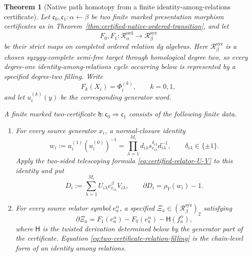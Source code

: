 \documentclass[11pt]{article}
\newtheorem{theorem}{Theorem}[section]
\theoremstyle{definition}
\begin{document}
\begin{theorem}[Native path homotopy from a finite identity-among-relations certificate]\label{thm:native-ordered-path-homotopy}
Let $\mathfrak c_0,\mathfrak c_1:\alpha\leftarrow\beta$ be two finite marked
presentation morphism certificates as in
Theorem~\ref{thm:certified-native-ordered-transition}, and let
\[
 F_0,F_1:\mathcal R_\alpha^{\mathrm{ord}}\longrightarrow
 \mathcal R_\beta^{\mathrm{syz}}
\]
be their strict maps on completed ordered relation dg algebras.  Here
$\mathcal R_\beta^{\mathrm{syz}}$ is a chosen syzygy-complete semi-free target
through homological degree two, so every degree-one identity-among-relations
cycle occurring below is represented by a specified degree-two filling.  Write
\[
 F_k(X_i)=\Phi_i^{(k)},\qquad k=0,1,
\]
and let $u_i^{(k)}(y)$ be the corresponding generator word.

A \emph{finite marked two-certificate}
$\mathfrak h:\mathfrak c_0\Rightarrow\mathfrak c_1$ consists of the following
finite data.
\begin{enumerate}[label=\textnormal{(\alph*)}]
\item For every source generator $x_i$, a normal-closure identity
\begin{equation}\label{eq:two-certificate-generator-identity}
 w_i:=u_i^{(1)}(u_i^{(0)})^{-1}
 =\prod_{\lambda=1}^{M_i}
 d_{i\lambda}s_{c_{i\lambda}}^{\delta_{i\lambda}}d_{i\lambda}^{-1},
 \qquad \delta_{i\lambda}\in\{\pm1\}.
\end{equation}
Apply the two-sided telescoping formula
\eqref{eq:certified-relator-U-V} to this identity and put
\begin{equation}\label{eq:two-certificate-generator-syzygy}
 D_i:=\sum_{\lambda=1}^{M_i}
 U_{i\lambda}e_{c_{i\lambda}}^\beta V_{i\lambda},
 \qquad
 \partial D_i=\rho_Y(w_i)-1.
\end{equation}
\item For every source relator symbol $e_a^\alpha$, a specified
$\Xi_a\in(\mathcal R_\beta^{\mathrm{syz}})_2$ satisfying
\begin{equation}\label{eq:two-certificate-relation-filling}
 \partial\Xi_a
 =F_1(e_a^\alpha)-F_0(e_a^\alpha)
   -\mathsf H\!\left(f_a^\alpha\right),
\end{equation}
where $\mathsf H$ is the twisted derivation determined below by the generator
part of the certificate.  Equation
\eqref{eq:two-certificate-relation-filling} is the chain-level form of an
identity among relations.
\end{enumerate}


\end{theorem}
\end{document}
